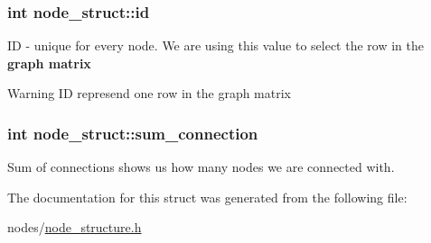 \subsubsection[{\texorpdfstring{id}{id}}]{\setlength{\rightskip}{0pt plus 5cm}int node\+\_\+struct\+::id}\hypertarget{structnode__struct_aad2827c7c2c957838445ff15ccc5a7f9}{}\label{structnode__struct_aad2827c7c2c957838445ff15ccc5a7f9}
ID -\/ unique for every node. We are using this value to select the row in the {\bfseries graph matrix} \begin{DoxyWarning}{Warning}
ID represend one row in the graph matrix 
\end{DoxyWarning}
\subsubsection[{\texorpdfstring{sum\+\_\+connection}{sum_connection}}]{\setlength{\rightskip}{0pt plus 5cm}int node\+\_\+struct\+::sum\+\_\+connection}\hypertarget{structnode__struct_aed6e2d1b4c5803f06fce262251d5aa40}{}\label{structnode__struct_aed6e2d1b4c5803f06fce262251d5aa40}
Sum of connections shows us how many nodes we are connected with. 

The documentation for this struct was generated from the following file\+:\begin{DoxyCompactItemize}
\item 
nodes/\hyperlink{node__structure_8h}{node\+\_\+structure.\+h}\end{DoxyCompactItemize}
